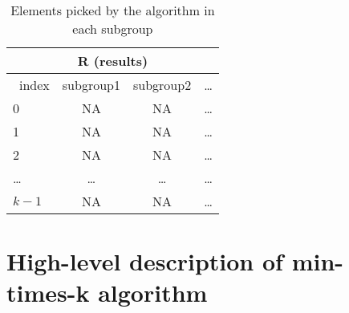 \documentclass[a4paper]{article}
\begin{document}
\begin{table}
\centering
\begin{tabular} {| l ||c |c |c |}  
\multicolumn{ 4 }{c}{ R (results) } \\ \hline 
   \ index  & subgroup1 & subgroup2 & \ldots \\ \hline \hline 
0 & NA & NA & \ldots \\ \hline 
1 & NA & NA & \ldots\\ \hline 
2 & NA & NA & \ldots\\ \hline 
\ldots & \ldots & \ldots & \ldots \\ \hline 
$k-1$ & NA & NA & \ldots\\ \hline 
\end{tabular} 
\caption{Elements picked by the algorithm in each subgroup}
\label{tab:R_0}
\end{table}


\section{High-level description of min-times-k algorithm}
\end{document}
